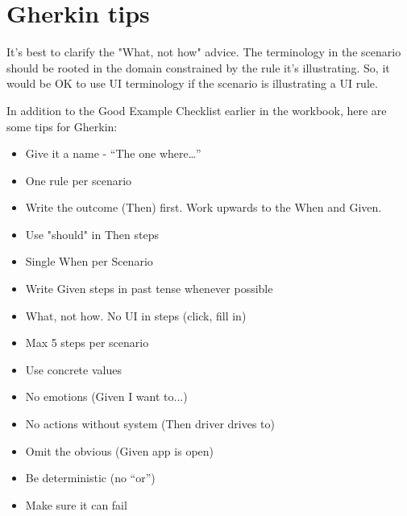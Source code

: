 \chapter*{Gherkin tips}

\ifnotes

    It's best to clarify the "What, not how" advice. The terminology in the scenario should be rooted in the domain constrained by the rule it's illustrating. So, it would be OK to use UI terminology if the scenario is illustrating a UI rule.

\fi 

\ifcontent

    In addition to the Good Example Checklist earlier in the workbook, here are some tips for Gherkin:
    
    \begin{itemize}
        \item Give it a name - “The one where…”
        \item One rule per scenario
        \item Write the outcome (Then) first. Work upwards to the When and Given.
        \item Use "should" in Then steps
        \item Single When per Scenario
        \item Write Given steps in past tense whenever possible
        \item What, not how. No UI in steps (click, fill in)
        \item Max 5 steps per scenario
        \item Use concrete values
        \item No emotions (Given I want to...)
        \item No actions without system (Then driver drives to) 
        \item Omit the obvious (Given app is open)
        \item Be deterministic (no “or”)
        \item Make sure it can fail 
    \end{itemize}
    
\fi